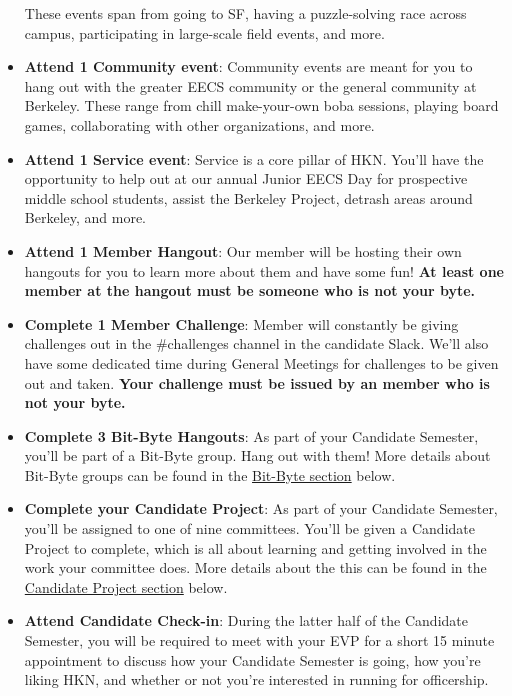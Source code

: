 \documentclass[11pt, article, oneside]{memoir}
\begin{document}
\begin{itemize}
                    These events span from going to SF, having a puzzle-solving race across campus, participating in large-scale field events, and more.
                \item
                    \textbf{Attend 1 Community event}: Community events are meant for you to hang out with the greater EECS community or the general community at Berkeley.
                    These range from chill make-your-own boba sessions, playing board games, collaborating with other organizations, and more.
                \item
                    \textbf{Attend 1 Service event}: Service is a core pillar of HKN.
                    You'll have the opportunity to help out at our annual Junior EECS Day for prospective middle school students, assist the Berkeley Project, detrash areas around Berkeley, and more.
                \item
                    \textbf{Attend 1 Member Hangout}: Our member will be hosting their own hangouts for you to learn more about them and have some fun!
                    \textbf{At least one member at the hangout must be someone who is not your byte.}
                \item
                    \textbf{Complete 1 Member Challenge}: Member will constantly be giving challenges out in the \#challenges channel in the candidate Slack.
                    We'll also have some dedicated time during General Meetings for challenges to be given out and taken.
                    \textbf{Your challenge must be issued by an member who is not your byte.}
                \item
                    \textbf{Complete 3 Bit-Byte Hangouts}: As part of your Candidate Semester, you'll be part of a Bit-Byte group.
                    Hang out with them!
                    More details about Bit-Byte groups can be found in the \hyperref[sec:bit-byte-groups]{Bit-Byte section} below.
                \item
                    \textbf{Complete your Candidate Project}: As part of your Candidate Semester, you'll be assigned to one of nine committees.
                    You'll be given a Candidate Project to complete, which is all about learning and getting involved in the work your committee does.
                    More details about the this can be found in the \hyperref[sec:candidate-project]{Candidate Project section} below.
                \item
                    \textbf{Attend Candidate Check-in}: During the latter half of the Candidate Semester, you will be required to meet with your EVP for a short 15 minute appointment to discuss how your Candidate Semester is going, how you're liking HKN, and whether or not you're interested in running for officership.

\end{itemize}
\end{document}
